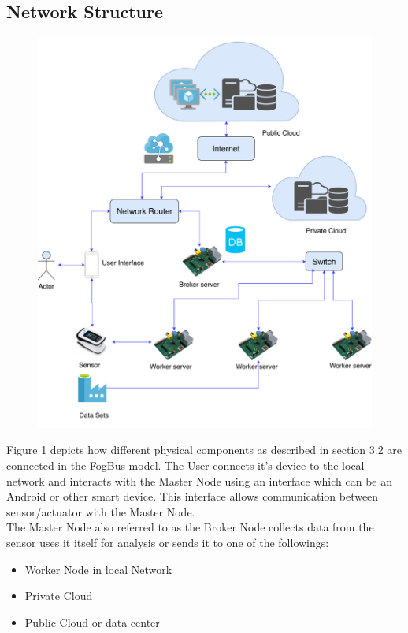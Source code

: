 \documentclass[AMA,STIX1COL]{WileyNJD-v2}
\begin{document}
\subsection{Network Structure}
\begin{figure}[h]
\centering
\includegraphics[width=13cm]{network-arch}
\end{figure}
Figure 1 depicts how different physical components as described in section 3.2 are connected in the FogBus model. The User connects it's device to the local network and interacts with the Master Node using an interface which can be an Android or other smart device. This interface allows communication between sensor/actuator with the Master Node. \\
The Master Node also referred to as the Broker Node collects data from the sensor uses it itself for analysis or sends it to one of the followings:
\begin{itemize}
\item Worker Node in local Network
\item Private Cloud
\item Public Cloud or data center
\end{itemize}
\end{document}
